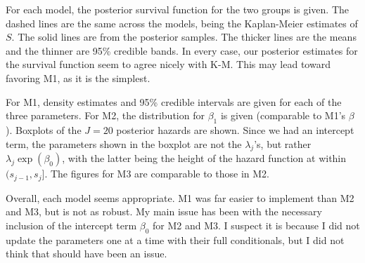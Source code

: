 \documentclass[12pt]{article}
\begin{document}
\noindent For each model, the posterior survival function for the two groups is given. The dashed lines are the same across the models, being the Kaplan-Meier estimates of $S$. The solid lines are from the posterior samples. The thicker lines are the means and the thinner are 95\% credible bands. In every case, our posterior estimates for the survival function seem to agree nicely with K-M. This may lead toward favoring M1, as it is the simplest.
\bigskip

\noindent For M1, density estimates and 95\% credible intervals are given for each of the three parameters. For M2, the distribution for $\beta_1$ is given (comparable to M1's $\beta$). Boxplots of the $J=20$ posterior hazards are shown. Since we had an intercept term, the parameters shown in the boxplot are not the $\lambda_j$'s, but rather $\lambda_j \exp(\beta_0)$, with the latter being the height of the hazard function at within $(s_{j-1},s_j]$. The figures for M3 are comparable to those in M2.
\bigskip

\noindent Overall, each model seems appropriate. M1 was far easier to implement than M2 and M3, but is not as robust. My main issue has been with the necessary inclusion of the intercept term $\beta_0$ for M2 and M3. I suspect it is because I did not update the parameters one at a time with their full conditionals, but I did not think that should have been an issue.


\newpage
\end{document}
